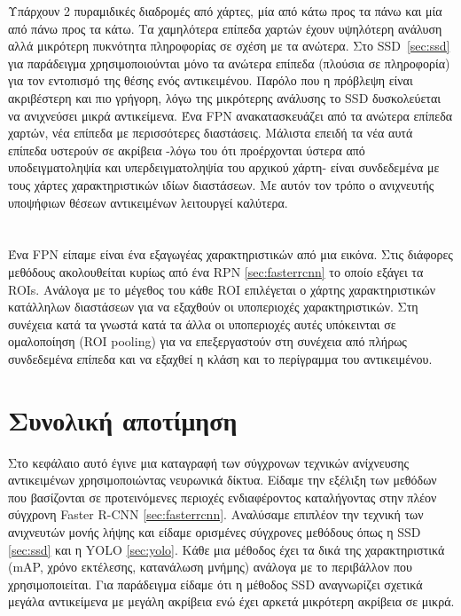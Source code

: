 Υπάρχουν 2 πυραμιδικές διαδρομές από χάρτες, μία από κάτω προς τα πάνω και μία
από πάνω προς τα κάτω. Τα χαμηλότερα επίπεδα χαρτών έχουν υψηλότερη ανάλυση αλλά
μικρότερη πυκνότητα πληροφορίας σε σχέση με τα ανώτερα. Στο SSD~\ref{sec:ssd} για παράδειγμα
χρησιμοποιούνται μόνο τα ανώτερα επίπεδα (πλούσια σε πληροφορία) για τον εντοπισμό
της θέσης ενός αντικειμένου. Παρόλο που η πρόβλεψη είναι ακριβέστερη και πιο γρήγορη,
λόγω της μικρότερης ανάλυσης το SSD δυσκολεύεται να ανιχνεύσει μικρά αντικείμενα.
Ένα FPN ανακατασκευάζει από τα ανώτερα επίπεδα χαρτών, νέα επίπεδα με περισσότερες διαστάσεις.
Μάλιστα επειδή τα νέα  αυτά επίπεδα υστερούν σε ακρίβεια -λόγω του ότι προέρχονται ύστερα από υποδειγματοληψία
και υπερδειγματοληψία του αρχικού χάρτη- είναι συνδεδεμένα με τους χάρτες χαρακτηριστικών
ιδίων διαστάσεων. Με αυτόν τον τρόπο ο ανιχνευτής υποψήφιων θέσεων αντικειμένων
λειτουργεί καλύτερα.
\paragraph{} \hspace{0em} \\
Ένα FPN είπαμε είναι ένα εξαγωγέας χαρακτηριστικών από μια εικόνα. Στις διάφορες
μεθόδους ακολουθείται κυρίως από ένα RPN \ref{sec:fasterrcnn} το οποίο εξάγει τα ROIs.
Ανάλογα με το μέγεθος του κάθε ROI επιλέγεται ο χάρτης χαρακτηριστικών κατάλληλων
διαστάσεων για να εξαχθούν οι υποπεριοχές χαρακτηριστικών. Στη συνέχεια κατά τα
γνωστά κατά τα άλλα οι υποπεριοχές αυτές υπόκεινται σε ομαλοποίηση (ROI pooling)
για να επεξεργαστούν στη συνέχεια από πλήρως συνδεδεμένα επίπεδα και να εξαχθεί
η κλάση και το περίγραμμα του αντικειμένου.


\section{Συνολική αποτίμηση}\label{sec:objdetchoice}

Στο κεφάλαιο αυτό έγινε μια καταγραφή των σύγχρονων τεχνικών ανίχνευσης αντικειμένων
χρησιμοποιώντας νευρωνικά δίκτυα. Είδαμε την εξέλιξη των μεθόδων που βασίζονται
σε προτεινόμενες περιοχές ενδιαφέροντος καταλήγοντας στην πλέον σύγχρονη Faster R-CNN
\ref{sec:fasterrcnn}. Αναλύσαμε επιπλέον την τεχνική των ανιχνευτών μονής λήψης
και είδαμε ορισμένες σύγχρονες μεθόδους όπως η SSD \ref{sec:ssd} και η YOLO \ref{sec:yolo}.
Κάθε μια μέθοδος έχει τα δικά της χαρακτηριστικά (mAP, χρόνο εκτέλεσης, κατανάλωση μνήμης)
ανάλογα με το περιβάλλον που χρησιμοποιείται. Για παράδειγμα είδαμε ότι η μέθοδος
SSD αναγνωρίζει σχετικά μεγάλα αντικείμενα με μεγάλη ακρίβεια ενώ έχει αρκετά
μικρότερη ακρίβεια σε μικρά.

